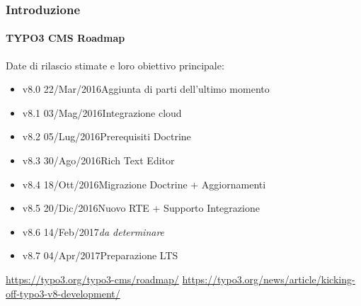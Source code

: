 \begin{frame}[fragile]
	\frametitle{Introduzione}
	\framesubtitle{TYPO3 CMS Roadmap}

	Date di rilascio stimate e loro obiettivo principale:

	\begin{itemize}

		\item v8.0 \tabto{1.1cm}22/Mar/2016\tabto{3.4cm}Aggiunta di parti dell'ultimo momento
		\item v8.1 \tabto{1.1cm}03/Mag/2016\tabto{3.4cm}Integrazione cloud
		\item v8.2 \tabto{1.1cm}05/Lug/2016\tabto{3.4cm}Prerequisiti Doctrine
		\item v8.3 \tabto{1.1cm}30/Ago/2016\tabto{3.4cm}Rich Text Editor
		\item
			\begingroup
				\color{typo3orange}
					v8.4 \tabto{1.1cm}18/Ott/2016\tabto{3.4cm}Migrazione Doctrine + Aggiornamenti
			\endgroup
		\item v8.5 \tabto{1.1cm}20/Dic/2016\tabto{3.4cm}Nuovo RTE + Supporto Integrazione
		\item v8.6 \tabto{1.1cm}14/Feb/2017\tabto{3.4cm}\textit{da determinare}
		\item v8.7 \tabto{1.1cm}04/Apr/2017\tabto{3.4cm}Preparazione LTS

	\end{itemize}

	\smaller
		\url{https://typo3.org/typo3-cms/roadmap/}\newline
		\url{https://typo3.org/news/article/kicking-off-typo3-v8-development/}
	\normalsize

\end{frame}

